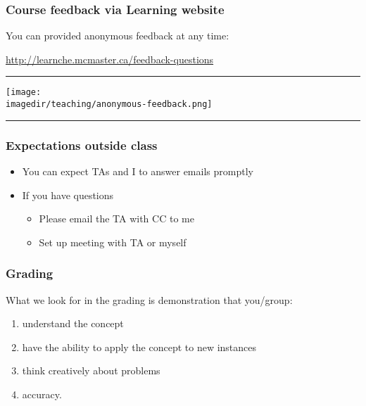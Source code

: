 \begin{frame}\frametitle{Course feedback via Learning website}
	
	You can provided anonymous feedback at any time:
	
	\vspace{12pt}
	\href{http://learnche.mcmaster.ca/feedback-questions}{http://learnche.mcmaster.ca/feedback-questions}
	\vspace{12pt}
	\hrule
	\begin{center}
		\texttt{[image: \\imagedir/teaching/anonymous-feedback.png]}
	\end{center}
	\hrule
\end{frame}

\begin{frame}\frametitle{Expectations outside class}
	\begin{itemize}
		\item	You can expect TAs and I to answer emails promptly
		\item	If you have questions
			\begin{itemize}
				\item	Please email the TA with CC to me 
				\item	Set up meeting with TA or myself
			\end{itemize}
	\end{itemize}
\end{frame}

\begin{frame}\frametitle{Grading}
	What we look for in the grading is demonstration that you/group:
	\begin{enumerate}
		\item	understand the concept
		\item	have the ability to apply the concept to new instances
		\item	think creatively about problems
		\item	accuracy.
	\end{enumerate}
\end{frame}

